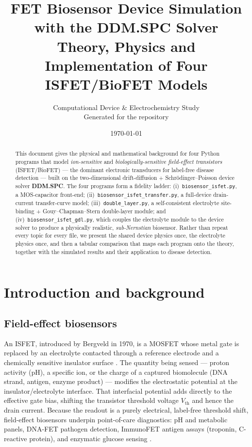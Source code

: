 \documentclass[11pt,a4paper]{article}
\title{\bfseries FET Biosensor Device Simulation with the DDM.SPC Solver\\[4pt]
\large Theory, Physics and Implementation of Four ISFET/BioFET Models}
\author{Computational Device \& Electrochemistry Study\\
\small Generated for the \code{CODEC-26} repository}
\date{\today}
\newcommand{\code}[1]{\texttt{#1}}
\begin{document}
\maketitle

\begin{abstract}
\noindent
This document gives the physical and mathematical background for four
Python programs that model \emph{ion-sensitive} and \emph{biologically-sensitive
field-effect transistors} (ISFET/BioFET) --- the dominant electronic transducers
for label-free disease detection --- built on the two-dimensional
drift-diffusion + Schr\"odinger--Poisson device solver \textbf{DDM.SPC}. The four
programs form a fidelity ladder: (i)~\code{biosensor\_isfet.py}, a MOS-capacitor
front-end; (ii)~\code{biosensor\_isfet\_transfer.py}, a full-device
drain-current transfer-curve model; (iii)~\code{double\_layer.py}, a
self-consistent electrolyte site-binding + Gouy--Chapman--Stern double-layer
module; and (iv)~\code{biosensor\_isfet\_gdl.py}, which couples the electrolyte
module to the device solver to produce a physically realistic, \emph{sub-Nernstian}
biosensor. Rather than repeat every topic for every file, we present the shared
device physics once, the electrolyte physics once, and then a tabular comparison
that maps each program onto the theory, together with the simulated results and
their application to disease detection.
\end{abstract}

\tableofcontents

\section{Introduction and background}
\label{sec:intro}

\subsection{Field-effect biosensors}
An ISFET, introduced by Bergveld in 1970, is a MOSFET whose metal gate is
replaced by an electrolyte contacted through a reference electrode and a
chemically sensitive insulator surface \cite{bergveld1970,bergveld2003}. The
quantity being sensed --- proton activity (pH), a specific ion, or the charge of
a captured biomolecule (DNA strand, antigen, enzyme product) --- modifies the
electrostatic potential at the insulator/electrolyte interface. That interfacial
potential adds directly to the effective gate bias, shifting the transistor
threshold voltage $V_{\mathrm{th}}$ and hence the drain current. Because the
readout is a purely electrical, label-free threshold shift, field-effect
biosensors underpin point-of-care diagnostics: pH and metabolic panels, DNA-FET
pathogen detection, ImmunoFET antigen assays (troponin, C-reactive protein), and
enzymatic glucose sensing \cite{poghossian2014,schoning2002}.
\end{document}
